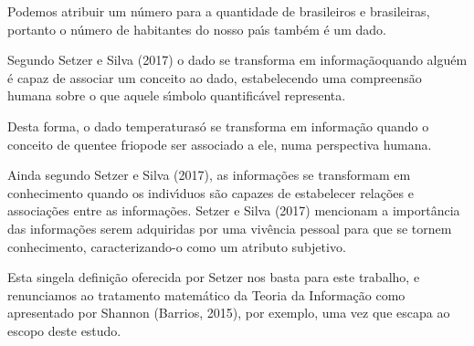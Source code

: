 \documentclass[
12pt,		%
openright,	%
twoside,  %
a4paper,			%
chapter=TITLE,		%
english,			%
french,				%
spanish,			%
brazil				%
]{USPSC-classe/USPSC}
\begin{document}
Podemos atribuir um n\'umero para a quantidade de brasileiros e brasileiras, portanto o n\'umero de habitantes do nosso pa\'{\i}s tamb\'em \'e um dado.














Segundo Setzer e Silva (2017) o dado se transforma em \textquotedbl informa\c{c}\~ao\textquotedbl  quando algu\'em \'e capaz de associar um conceito ao dado, estabelecendo uma compreens\~ao humana sobre o que aquele s\'{\i}mbolo quantific\'avel representa.














Desta forma, o dado \textquotedbl temperatura\textquotedbl  s\'o se transforma em informa\c{c}\~ao quando o conceito de \textquotedbl quente\textquotedbl  e \textquotedbl frio\textquotedbl  pode ser associado a ele, numa perspectiva humana.














Ainda segundo Setzer e Silva (2017), as informa\c{c}\~oes se transformam em conhecimento quando os indiv\'{\i}duos s\~ao capazes de estabelecer rela\c{c}\~oes e associa\c{c}\~oes entre as informa\c{c}\~oes.  Setzer e Silva (2017) mencionam a import\^ancia das informa\c{c}\~oes serem adquiridas por uma viv\^encia pessoal para que se tornem conhecimento, caracterizando-o como um atributo subjetivo.














Esta singela defini\c{c}\~ao oferecida por Setzer nos basta para este trabalho, e renunciamos ao tratamento matem\'atico da Teoria da Informa\c{c}\~ao como apresentado por Shannon (Barrios, 2015), por exemplo, uma vez que escapa ao escopo deste estudo.
\end{document}
